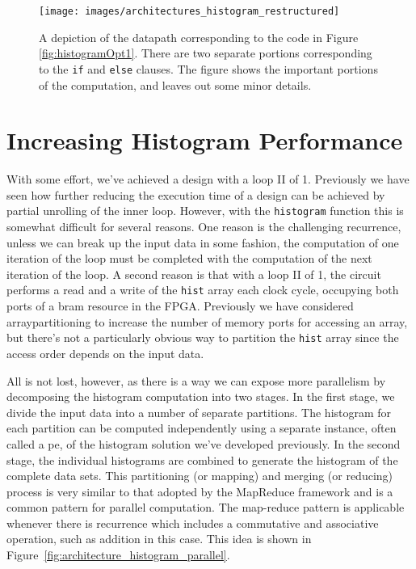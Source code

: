 \begin{figure}
\centering
\texttt{[image: images/architectures\_histogram\_restructured]}
\caption{ A depiction of the datapath corresponding to the code in Figure \ref{fig:histogramOpt1}. There are two separate portions corresponding to the \lstinline{if} and \lstinline{else} clauses. The figure shows the important portions of the computation, and leaves out some minor details. }
\label{fig:architecture_histogram_restructured}
\end{figure}

\section{Increasing Histogram Performance}

With some effort, we've achieved a design with a loop II of 1.  Previously we have seen how further reducing the execution time of a design can be achieved by partial unrolling of the inner loop.  However, with the \lstinline|histogram| function this is somewhat difficult for several reasons.  One reason is the challenging recurrence, unless we can break up the input data in some fashion, the computation of one iteration of the loop must be completed with the computation of the next iteration of the loop. A second reason is that with a loop II of 1, the circuit performs a read and a write of the \lstinline|hist| array each clock cycle, occupying both ports of a \gls{bram} resource in the FPGA.   Previously we have considered \gls{arraypartitioning} to increase the number of memory ports for accessing an array, but there's not a particularly obvious way to partition the \lstinline|hist| array since the access order depends on the input data.

All is not lost, however, as there is a way we can expose more parallelism by decomposing the histogram computation into two stages.  In the first stage, we divide the input data into a number of separate partitions.  The histogram for each partition can be computed independently using a separate instance, often called a \gls{pe}, of the histogram solution we've developed previously.  In the second stage, the individual histograms are combined to generate the histogram of the complete data sets.  This partitioning (or mapping) and merging (or reducing) process is very similar to that adopted by the MapReduce framework \cite{dean08mapreduce} and is a common pattern for parallel computation.  The map-reduce pattern is applicable whenever there is recurrence which includes a commutative and associative operation, such as addition in this case. This idea is shown in Figure~\ref{fig:architecture_histogram_parallel}. 

